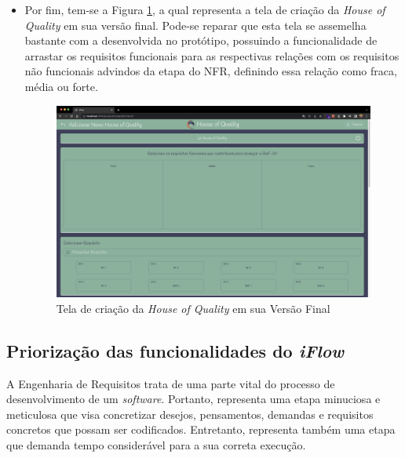 \begin{itemize}
    \item Por fim, tem-se a Figura \ref{fig:house_of_quality_implementado}, a qual representa a tela de criação da \textit{House of Quality} em sua versão final. Pode-se reparar que esta tela se assemelha bastante com a desenvolvida no protótipo, possuindo a funcionalidade de arrastar os requisitos funcionais para as respectivas relações com os requisitos não funcionais advindos da etapa do NFR, definindo essa relação como fraca, média ou forte.
    \begin{figure}[H]
      \begin{center}
          \caption{{Tela de criação da \textit{House of Quality} em sua Versão Final}}
          \label{fig:house_of_quality_implementado}
          \includegraphics[scale=0.2]{figuras/TelasDesenvolvidas/house-of-quality-implementada.png}
    \end{center}
    \end{figure}

\end{itemize}

\subsection{Priorização das funcionalidades do \textit{iFlow}}

\label{sec:priorizacao_iFlow}

A Engenharia de Requisitos trata de uma parte vital do processo de desenvolvimento de um \textit{software}. Portanto, representa uma etapa minuciosa e meticulosa que visa concretizar desejos, pensamentos, demandas e requisitos concretos que possam ser codificados. Entretanto, representa também uma etapa que demanda tempo considerável para a sua correta execução.

